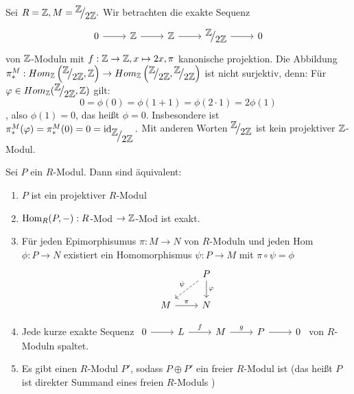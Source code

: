 \begin{bsp}
	Sei $ R = \Z  ,M = \QR{\Z}{2\Z}. $ Wir betrachten die exakte Sequenz  \\ $$\begin{tikzcd}
	0  \arrow{r} & \Z \arrow{r} & \Z \arrow{r} & \QR{\Z}{2\Z} \arrow{r} & 0
	\end{tikzcd}$$ von $\mathbb{Z}$-Moduln  mit $f: \mathbb{Z} \to \mathbb{Z}, x \mapsto 2x, \pi $ kanonische projektion. Die Abbildung $ \pi_{*}^{M}: Hom_{\Z}\left(\QR{\Z}{2\Z}, \Z\right) \to Hom_{\Z}\left(\QR{\Z}{2\Z},\QR{\Z}{2\Z}\right) $ ist nicht surjektiv, denn:  Für $ \phi \in Hom_{\Z}(\QR{\Z}{2\Z}, \Z) $ gilt: 
	$$0 = \phi(0) = \phi( 1 +1) = \phi(2\cdot 1) = 2\phi(1)$$, also $ \phi(1)= 0$, das heißt $\phi = 0$. Insbesondere ist $\pi_{*}^{M}(\phi) = \pi_{*}^{M}(0) =0 = \id_{\QR{\Z}{2\Z}} . $ Mit anderen Worten $\QR{\Z}{2\Z}$ ist kein projektiver $\mathbb{Z}$-Modul. 
\end{bsp}
\begin{sa}\label{6.3}
	Sei $P$ ein $R$-Modul. Dann sind äquivalent:
	\begin{enumerate} [label= \roman*)]
		\item $P$ ist ein projektiver $R$-Modul 
		\item $\operatorname{Hom}_R(P,-): R$-Mod $\to \mathbb{Z}$-Mod ist exakt.
		\item Für jeden Epimorphisumus $ \pi: M \to N $ von $R$-Moduln und jeden Hom $ \phi: P \to N $ existiert ein Homomorphismus $\psi: P \to M $ mit $ \pi \circ \psi = \phi$
		$$\begin{tikzcd}
		& P \arrow[swap, dashed]{dl}{\psi} \arrow{d}{\phi} \\
		M \arrow{r}{\pi} & N
		\end{tikzcd}$$
		\item Jede kurze exakte Sequenz $\begin{tikzcd}
		0  \arrow{r} & L \arrow{r}{f} & M \arrow{r}{g} & P \arrow{r} & 0
		\end{tikzcd} $ von $R$-Moduln spaltet.
		\item Es gibt einen $R$-Modul $P'$, sodass $ P \oplus P' $ ein freier $R$-Modul ist (das heißt $P$ ist direkter Summand eines freien $R$-Moduls )
	\end{enumerate}
\end{sa}
